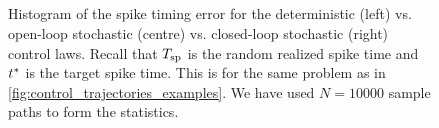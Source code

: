 \documentclass[12pt]{iopart}
\begin{document}
\begin{figure}[h]  
\begin{center}
\\
  \\
\\
\\
  \caption[labelInTOC]{Histogram of the spike timing error for the
  deterministic (left) vs. open-loop stochastic (centre) vs. closed-loop
  stochastic (right) control laws.
  Recall that ${ T_{\textrm{sp} } }$ is the random realized spike time and ${ t^* }$ is the target
  spike time.  
  This is for the same problem as in
  \cref{fig:control_trajectories_examples}.
  We have used $N=10000$ sample paths
  to form the statistics.}
  \label{fig:error_histograms_det_vs_openloop_vs_stoch}
\end{center}
\end{figure}
\end{document}
